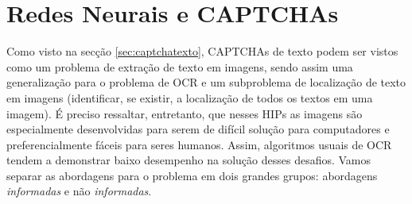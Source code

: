 \section{Redes Neurais e CAPTCHAs}

Como visto na secção \ref{sec:captchatexto}, CAPTCHAs de texto podem ser vistos como um problema de extração de texto em imagens, sendo assim uma generalização para o problema de OCR e um subproblema de localização de texto em imagens (identificar, se existir, a localização de todos os textos em uma imagem). É preciso ressaltar, entretanto, que nesses HIPs as imagens são especialmente desenvolvidas para serem de difícil solução para computadores e preferencialmente fáceis para seres humanos. Assim, algoritmos usuais de OCR tendem a demonstrar baixo desempenho na solução desses desafios. Vamos separar as abordagens para o problema em dois grandes grupos: abordagens \textit{informadas} e não \textit{informadas}.

